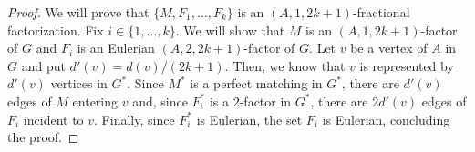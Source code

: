 \documentclass[12pt,reqno,a4paper]{amsart}
\newtheorem{corollary}[theorem]{Corollary}
\begin{document}
\begin{proof}
We will prove that \(\{M,F_1,\ldots,F_k\}\) is an \((A,1,2k+1)\)-fractional 
factorization. Fix $i\in\{1,\ldots,k\}$. We will show that \(M\) is an \((A,1,2k+1)\)-factor of $G$ 
and \(F_i\) is an Eulerian \((A,2,2k+1)\)-factor of $G$.
Let \(v\) be a vertex of \(A\) in \(G\) and put \(d'(v) = d(v)/(2k+1)\). Then, we know that 
\(v\) is represented by \(d'(v)\) vertices in \(G^*\).
Since \(M^*\) is a perfect matching in \(G^*\), there are \(d'(v)\) edges
of \(M\) entering \(v\) and, since \(F^*_i\) is a \(2\)-factor in \(G^*\),
there are \(2d'(v)\) edges of \(F_i\) incident to \(v\).
Finally, since \(F^*_i\) is Eulerian, the set
\(F_i\) is Eulerian, concluding the proof. 
\end{proof}

\end{document}
